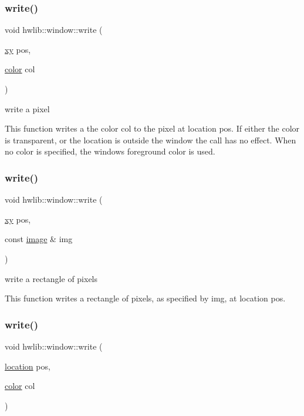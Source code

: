 \subsubsection{\texorpdfstring{write()}{write()}\hspace{0.1cm}{\footnotesize\ttfamily [1/4]}}
{\footnotesize\ttfamily void hwlib\+::window\+::write (\begin{DoxyParamCaption}\item[{\hyperlink{classhwlib_1_1xy}{xy}}]{pos,  }\item[{\hyperlink{classhwlib_1_1color}{color}}]{col }\end{DoxyParamCaption})\hspace{0.3cm}{\ttfamily [inline]}}

write a pixel

This function writes a the color col to the pixel at location pos. If either the color is transparent, or the location is outside the window the call has no effect. When no color is specified, the window\textquotesingle{}s foreground color is used. \mbox{\label{classhwlib_1_1window_a53cdf4933161d82ba6d24140c69c3335}} 
\subsubsection{\texorpdfstring{write()}{write()}\hspace{0.1cm}{\footnotesize\ttfamily [2/4]}}
{\footnotesize\ttfamily void hwlib\+::window\+::write (\begin{DoxyParamCaption}\item[{\hyperlink{classhwlib_1_1xy}{xy}}]{pos,  }\item[{const \hyperlink{classhwlib_1_1image}{image} \&}]{img }\end{DoxyParamCaption})\hspace{0.3cm}{\ttfamily [inline]}}

write a rectangle of pixels

This function writes a rectangle of pixels, as specified by img, at location pos. \mbox{\label{classhwlib_1_1window_a65122042afeb55e41e5c03b5c8e26fff}} 
\subsubsection{\texorpdfstring{write()}{write()}\hspace{0.1cm}{\footnotesize\ttfamily [3/4]}}
{\footnotesize\ttfamily void hwlib\+::window\+::write (\begin{DoxyParamCaption}\item[{\hyperlink{classhwlib_1_1location}{location}}]{pos,  }\item[{\hyperlink{classhwlib_1_1color}{color}}]{col }\end{DoxyParamCaption})\hspace{0.3cm}{\ttfamily [inline]}}



